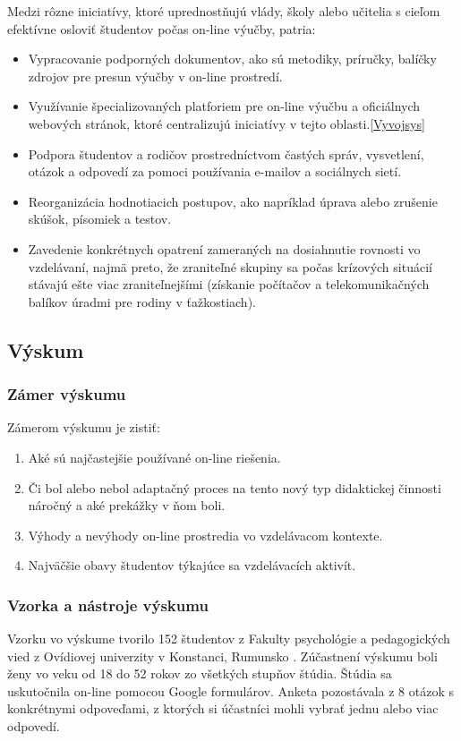 \documentclass[10pt,oneside,slovak,a4paper]{article}
\begin{document}
Medzi rôzne iniciatívy, ktoré uprednostňujú vlády, školy alebo učitelia s cieľom efektívne osloviť študentov počas on-line výučby, patria:  
\begin{itemize}
	\item Vypracovanie podporných dokumentov, ako sú metodiky, príručky, balíčky zdrojov pre presun výučby v on-line prostredí.
	\item Využívanie špecializovaných platforiem pre on-line výučbu a oficiálnych webových stránok, ktoré centralizujú iniciatívy v tejto oblasti.\ref{Vyvojsys}%
	\item Podpora študentov a rodičov prostredníctvom častých správ, vysvetlení, otázok a odpovedí za pomoci používania e-mailov a sociálnych sietí.
	\item Reorganizácia hodnotiacich postupov, ako napríklad úprava alebo zrušenie skúšok, písomiek a testov.
	\item Zavedenie konkrétnych opatrení zameraných na dosiahnutie rovnosti vo vzdelávaní, najmä preto, že zraniteľné skupiny sa počas krízových situácií stávajú ešte viac zraniteľnejšími (získanie počítačov a telekomunikačných balíkov úradmi pre rodiny v ťažkostiach).
\end{itemize}

\subsection{Výskum}%
\subsubsection{Zámer výskumu}
Zámerom výskumu je zistiť\cite{covid19}:
\begin{enumerate}
	\item Aké sú najčastejšie používané on-line riešenia.
	\item Či bol alebo nebol adaptačný proces na tento nový typ didaktickej činnosti náročný a aké prekážky v ňom boli.
	\item Výhody a nevýhody on-line prostredia vo vzdelávacom kontexte.
	\item Najväčšie obavy študentov týkajúce sa vzdelávacích aktivít. %
\end{enumerate}
\subsubsection{Vzorka a nástroje výskumu}
Vzorku vo výskume tvorilo 152 študentov z Fakulty psychológie a pedagogických vied z Ovídiovej univerzity v Konstanci, Rumunsko \cite{covid19}.
Zúčastnení výskumu boli ženy vo veku od 18 do 52 rokov zo všetkých stupňov štúdia.
Štúdia sa uskutočnila on-line pomocou Google formulárov. Anketa pozostávala z 8 otázok s konkrétnymi odpoveďami, z ktorých si účastníci mohli vybrať jednu alebo viac odpovedí. 
\end{document}
